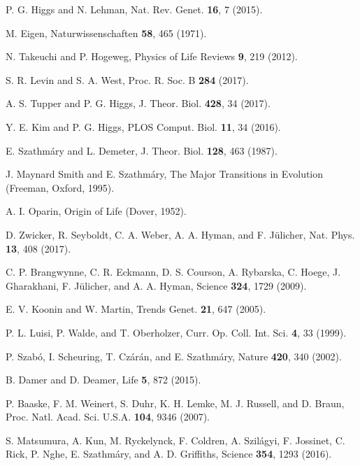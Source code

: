 \documentclass[twocolumn,showpacs,floatfix]{revtex4-1}
\begin{document}
\begin{thebibliography}{99}

 P. G. Higgs and N. Lehman, Nat. Rev. Genet. {\bf 16}, 7 (2015).

 M. Eigen, Naturwissenschaften {\bf 58}, 465 (1971).

 N. Takeuchi and P. Hogeweg, Physics of Life Reviews {\bf 9}, 219 (2012).

 S. R. Levin and S. A. West, Proc. R. Soc. B {\bf 284}
(2017).

 A. S. Tupper and P. G. Higgs, J. Theor. Biol. {\bf 428}, 34 (2017).

 Y. E. Kim and P. G. Higgs, 	PLOS Comput. Biol. {\bf 11}, 34 (2016).

 E. Szathm\'ary and L. Demeter, J. Theor. Biol. {\bf 128},
463 (1987).

 J. Maynard Smith and E. Szathm\'ary, The Major
Transitions in Evolution (Freeman, Oxford, 1995).

 A. I. Oparin, Origin of Life (Dover, 1952).

 D. Zwicker, R. Seyboldt, C. A. Weber, A. A. Hyman,
and F. J\"ulicher, Nat. Phys. {\bf 13}, 408 (2017).

 C. P. Brangwynne, C. R. Eckmann, D. S. Courson,
A. Rybarska, C. Hoege, J. Gharakhani,
F. J\"ulicher, and A. A. Hyman, Science {\bf 324}, 1729
(2009).

 E. V. Koonin and W. Martin, Trends Genet. {\bf 21},
647 (2005).

 P. L. Luisi, P. Walde, and T. Oberholzer, Curr.
Op. Coll. Int. Sci. {\bf 4}, 33 (1999).

 P. Szab\'o, I. Scheuring, T. Cz\'ar\'an, and E. Szathm\'ary, Nature {\bf 420}, 340 (2002).

 B. Damer and D. Deamer, Life {\bf 5}, 872 (2015).

 P. Baaske, F. M. Weinert, S. Duhr, K. H. Lemke,
M. J. Russell, and D. Braun, Proc. Natl. Acad.
Sci. U.S.A. {\bf 104}, 9346 (2007).

 S. Matsumura, A. Kun, M. Ryckelynck, F. Coldren,
A. Szil\'agyi, F. Jossinet, C. Rick, P. Nghe,
E. Szathm\'ary, and A. D. Griffiths, Science {\bf 354},
1293 (2016).


\end{thebibliography}
\end{document}
